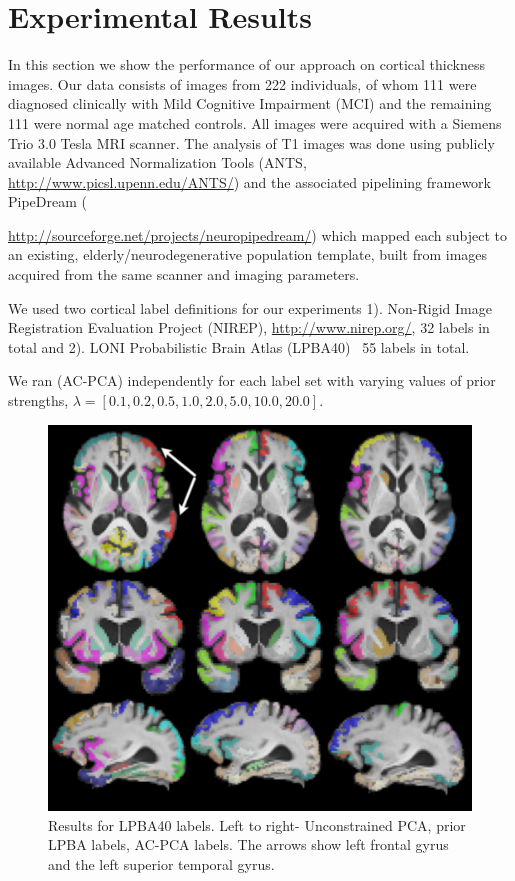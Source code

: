 \documentclass{llncs}
\begin{document}
\section{Experimental Results}
In this section we show the performance of our approach on cortical thickness images. Our data consists of images from 222 individuals, of whom 111 were diagnosed clinically with Mild Cognitive Impairment (MCI) and the remaining 111 were normal age matched controls. %
All images were acquired with a Siemens Trio 3.0 Tesla MRI scanner. The analysis of T1 images was done using publicly available Advanced Normalization Tools (ANTS, \url{http://www.picsl.upenn.edu/ANTS/}) and the associated pipelining framework PipeDream ({\url{http://sourceforge.net/projects/neuropipedream/}) which mapped each subject to an existing, elderly/neurodegenerative population template, built from images acquired from the same scanner and imaging parameters.

We used two cortical label definitions for our experiments 1). Non-Rigid Image Registration Evaluation Project (NIREP), \url{http://www.nirep.org/}, 32 labels in total and  2). LONI Probabilistic Brain Atlas (LPBA40)~\cite{lpba} 55 labels in total.


We ran (AC-PCA) independently for each label set with varying values of prior strengths, $\lambda =[0.1,0.2,0.5,1.0,2.0,5.0,10.0,20.0]$.

\begin{figure}
\begin{center}
\includegraphics[width=0.8\linewidth]{lpba.pdf} 
\end{center}
\vspace{-0.2in}
\caption{Results for LPBA40 labels. Left to right- Unconstrained PCA, prior LPBA labels, AC-PCA labels. The arrows show left frontal gyrus and the left superior temporal gyrus.}
\label{fig:priorlpba}
\end{figure}


}
\end{document}
